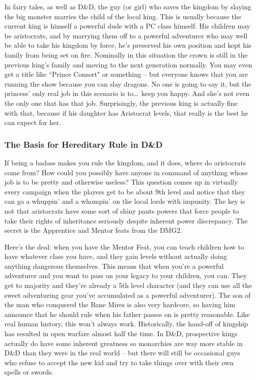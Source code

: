 In fairy tales, as well as D\&D, the guy (or girl) who saves the kingdom by slaying the big monster marries the child of the local king. This is usually because the current king is himself a powerful dude with a PC class himself. His children may be aristocrats, and by marrying them off to a powerful adventurer who may well be able to take his kingdom by force, he's preserved his own position and kept his family from being set on fire. Nominally in this situation the crown is still in the previous king's family and moving to the next generation normally. You may even get a title like ``Prince Consort" or something -- but everyone knows that you are running the show because you can slay dragons. No one is going to say it, but the princess' only real job in this scenario is to\ldots\  keep you happy. And she's not even the only one that has that job. Surprisingly, the previous king is actually fine with that, because if his daughter has Aristocrat levels, that really is the best he can expect for her.

\subsubsection{The Basis for Hereditary Rule in D\&D}
\vspace*{-8pt}

If being a badass makes you rule the kingdom, and it does, where do aristocrats come from? How could you possibly have anyone in command of anything whose job is to be pretty and otherwise useless? This question comes up in virtually every campaign when the players get to be about 9th level and notice that they can go a whuppin' and a whompin' on the local lords with impunity. The key is not that aristocrats have some sort of shiny pants powers that force people to take their rights of inheritance seriously despite inherent power discrepancy. The secret is the Apprentice and Mentor feats from the DMG2.

Here's the deal: when you have the Mentor Feat, you can teach children how to have whatever class you have, and they gain levels without actually doing anything dangerous themselves. This means that when you're a powerful adventurer and you want to pass on your legacy to your children, you can. They get to majority and they're already a 5th level character (and they can use all the sweet adventuring gear you've accumulated as a powerful adventurer). The son of the man who conquered the Bane Mires is also very hardcore, so having him announce that he should rule when his father passes on is pretty reasonable. Like real human history, this won't always work. Historically, the hand-off of kingship has resulted in open warfare almost half the time. In D\&D, prospective kings actually do have some inherent greatness so monarchies are way more stable in D\&D than they were in the real world -- but there will still be occasional guys who refuse to accept the new kid and try to take things over with their own spells or swords.


